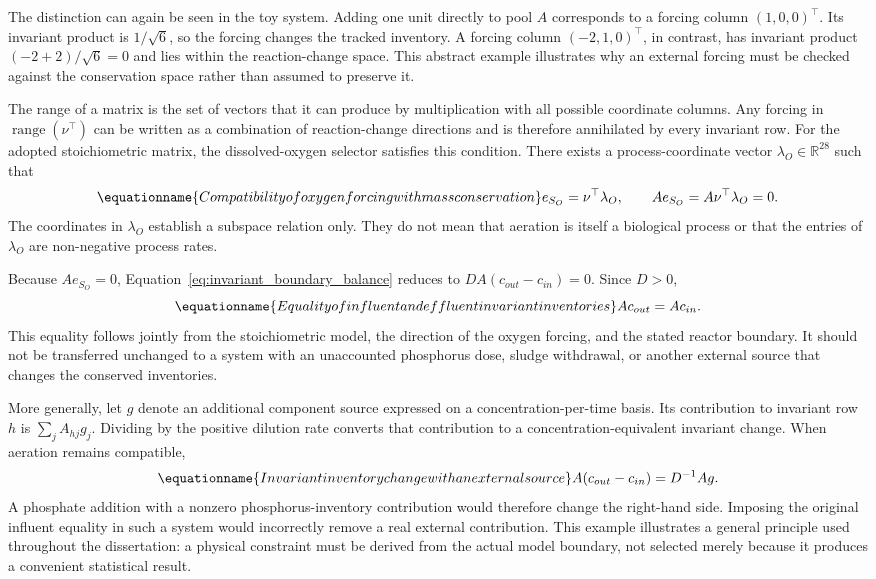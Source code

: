 The distinction can again be seen in the toy system. Adding one unit directly to pool $A$ corresponds to a forcing column $(1,0,0)^\top$. Its invariant product is $1/\sqrt6$, so the forcing changes the tracked inventory. A forcing column $(-2,1,0)^\top$, in contrast, has invariant product $(-2+2)/\sqrt6=0$ and lies within the reaction-change space. This abstract example illustrates why an external forcing must be checked against the conservation space rather than assumed to preserve it.

The range of a matrix is the set of vectors that it can produce by multiplication with all possible coordinate columns. Any forcing in $\operatorname{range}(\nu^\top)$ can be written as a combination of reaction-change directions and is therefore annihilated by every invariant row. For the adopted stoichiometric matrix, the dissolved-oxygen selector satisfies this condition. There exists a process-coordinate vector $\lambda_O\in\mathbb{R}^{28}$ such that
\begin{equation}
\equationname{Compatibility of oxygen forcing with mass conservation}
e_{S_O}=\nu^\top\lambda_O,\qquad
Ae_{S_O}=A\nu^\top\lambda_O=0.
\label{eq:oxygen_forcing_compatibility}
\end{equation}
The coordinates in $\lambda_O$ establish a subspace relation only. They do not mean that aeration is itself a biological process or that the entries of $\lambda_O$ are non-negative process rates.

Because $Ae_{S_O}=0$, Equation~\eqref{eq:invariant_boundary_balance} reduces to
$D A(c_{out}-c_{in})=0$. Since $D>0$,
\begin{equation}
\equationname{Equality of influent and effluent invariant inventories}
Ac_{out}=Ac_{in}.
\label{eq:reactor_invariant_equality}
\end{equation}
This equality follows jointly from the stoichiometric model, the direction of the oxygen forcing, and the stated reactor boundary. It should not be transferred unchanged to a system with an unaccounted phosphorus dose, sludge withdrawal, or another external source that changes the conserved inventories.

More generally, let $g$ denote an additional component source expressed on a concentration-per-time basis. Its contribution to invariant row $h$ is $\sum_jA_{hj}g_j$. Dividing by the positive dilution rate converts that contribution to a concentration-equivalent invariant change. When aeration remains compatible,
\begin{equation}
\equationname{Invariant inventory change with an external source}
A(c_{out}-c_{in})=D^{-1}Ag.
\label{eq:general_invariant_source}
\end{equation}
A phosphate addition with a nonzero phosphorus-inventory contribution would therefore change the right-hand side. Imposing the original influent equality in such a system would incorrectly remove a real external contribution. This example illustrates a general principle used throughout the dissertation: a physical constraint must be derived from the actual model boundary, not selected merely because it produces a convenient statistical result.

